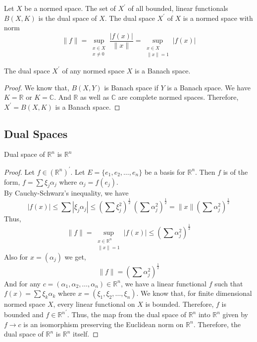 \begin{definition}
	Let $X$ be a normed space.
	The set of $X^\prime$ of all bounded, linear functionals $B(X,K)$ is the dual space of $X$.
	The dual space $X^\prime$ of $X$ is a normed space with norm
	\[ \|f\| = \sup_{\substack{x \in X\\ x \ne 0}} \frac{|f(x)|}{\|x\|} = \sup_{\substack{x \in X \\ \|x\| =1 }} |f(x)| \]
\end{definition}

\begin{theorem}
	The dual space $X^\prime$ of any normed space $X$ is a Banach space.
\end{theorem}
\begin{proof}
	We know that, $B(X,Y)$ is Banach space if $Y$ is a Banach space.
	We have $K = \mathbb{R}$ or $K = \mathbb{C}$.
	And $\mathbb{R}$ as well as $\mathbb{C}$ are complete normed spaces.
	Therefore, $X^\prime = B(X,K)$ is a Banach space.
\end{proof}

\subsection{Dual Spaces}
\begin{important}
\begin{remark}
	Dual space of $\mathbb{R}^n$ is $\mathbb{R}^n$
\end{remark}
\end{important}
\begin{proof}
	Let $f \in (\mathbb{R}^n)^\prime$.
	Let $E = \{e_1,e_2,\dots,e_n\}$ be a basis for $\mathbb{R}^n$.
	Then $f$ is of the form, $f = \sum \xi_j \alpha_j$ where $\alpha_j = f(e_j)$.\\

	By Cauchy-Schwarz's inequality, we have
	\[ |f(x)| \le \sum |\xi_j \alpha_j| \le \left( \sum \xi_j^2 \right)^\frac{1}{2} \ \left( \sum \alpha_j^2 \right)^\frac{1}{2} = \| x \| \left(\sum \alpha_j^2 \right)^\frac{1}{2} \]
	Thus,
	\[ \|f\| = \sup_{ \substack{x \in\mathbb{R}^n \\ \|x\|=1}} |f(x)| \le \left( \sum \alpha_j^2 \right)^\frac{1}{2} \]
	Also for $x = (\alpha_j)$ we get,
	\[ \|f\| = \left( \sum \alpha_j^2 \right)^\frac{1}{2} \]
	And for any $c = (\alpha_1,\alpha_2,\dots,\alpha_n) \in \mathbb{R}^n$, we have a linear functional $f$ such that $f(x) = \sum \xi_k \alpha_k$ where $x = (\xi_1,\xi_2,\dots,\xi_n)$.
	We know that, for finite dimensional normed space $X$, every linear functional on $X$ is bounded.
	Therefore, $f$ is bounded and $f \in {\mathbb{R}^n}^\prime$.
	Thus, the map from the dual space of $\mathbb{R}^n$ into $\mathbb{R}^n$ given by $f \to c$ is an isomorphism preserving the Euclidean norm on $\mathbb{R}^n$.
	Therefore, the dual space of $\mathbb{R}^n$ is $\mathbb{R}^n$ itself.
\end{proof}


